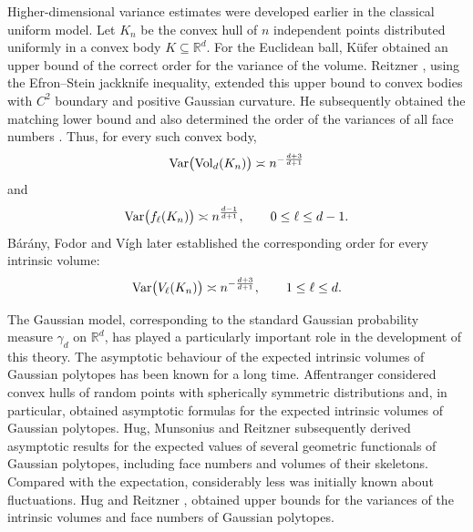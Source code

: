 \documentclass[10pt]{amsart}
\newcommand{\1}{\textbf{1}}
\newcommand{\Var}{{\rm Var}}
\numberwithin{equation}{section} %
\theoremstyle{remark}
\theoremstyle{definition}
\begin{document}
Higher-dimensional variance estimates were developed earlier in the classical
uniform model. Let $K_n$ be the convex hull of $n$ independent points
distributed uniformly in a convex body $K\subseteq\mathbb{R}^d$. For the
Euclidean ball, K\"ufer \cite{Kufer1994} obtained an upper bound of the
correct order for the variance of the volume. Reitzner \cite{Reitzner2003},  using the Efron--Stein jackknife inequality, extended this upper bound to convex bodies with $C^2$ boundary and positive Gaussian curvature. He subsequently obtained the matching lower
bound and also determined the order of the variances of all face numbers
\cite{Reitzner2005}. Thus, for every such convex body,
\[
    \Var\bigl(\operatorname{Vol}_d(K_n)\bigr)
    \asymp
    n^{-\frac{d+3}{d+1}}
\]
and
\[
    \Var\bigl(f_\ell(K_n)\bigr)
    \asymp
    n^{\frac{d-1}{d+1}},
    \qquad 0\leq \ell\leq d-1.
\]
B\'ar\'any, Fodor and V\'igh \cite{Bar-Fod-Vig} later established
the corresponding order for every intrinsic volume:
\[
    \Var\bigl(V_\ell(K_n)\bigr)
    \asymp
    n^{-\frac{d+3}{d+1}},
    \qquad 1\leq\ell\leq d.
\]

The Gaussian model, corresponding to the standard Gaussian probability measure
$\gamma_d$ on $\mathbb{R}^d$, has played a particularly important role in the
development of this theory. The asymptotic behaviour of the expected intrinsic volumes of Gaussian
polytopes has been known for a long time. Affentranger
\cite{Affentranger} considered convex hulls of random points with spherically symmetric distributions and, in particular, obtained asymptotic formulas for the expected intrinsic volumes of Gaussian polytopes. Hug, Munsonius
and Reitzner \cite{Hug-Mun-Rei} subsequently derived asymptotic results for the expected values of several geometric functionals of Gaussian polytopes, including face numbers and volumes of their skeletons. Compared with the expectation, considerably
less was initially known about fluctuations. Hug and Reitzner
\cite{Hug-Rei}, obtained upper bounds for the variances of the intrinsic volumes and face numbers of Gaussian polytopes.
\end{document}
